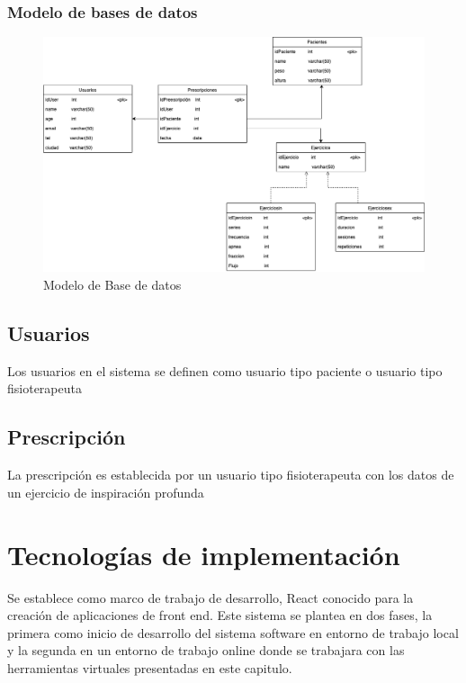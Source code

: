 \documentclass[12pt]{article}
\begin{document}

\subsubsection{Modelo de bases de datos}

\begin{figure}[ht]
\centering
\includegraphics[scale=0.36]{imag/Modelo DB.png}
\caption{Modelo de Base de datos}
\label{6}
\end{figure}
\FloatBarrier


\subsection{Usuarios} Los usuarios en el sistema se definen como usuario tipo paciente o usuario tipo fisioterapeuta
\subsection{Prescripción} La prescripción es establecida por un usuario tipo fisioterapeuta con los datos de un ejercicio de inspiración profunda %






\section{Tecnologías de implementación}

Se establece como marco de trabajo de desarrollo, React conocido para la creación de aplicaciones de front end. Este sistema se plantea en dos fases, la primera como inicio de desarrollo del sistema software en entorno de trabajo local y la segunda en un entorno de trabajo online donde se trabajara con las herramientas virtuales presentadas en este capitulo.
\end{document}
